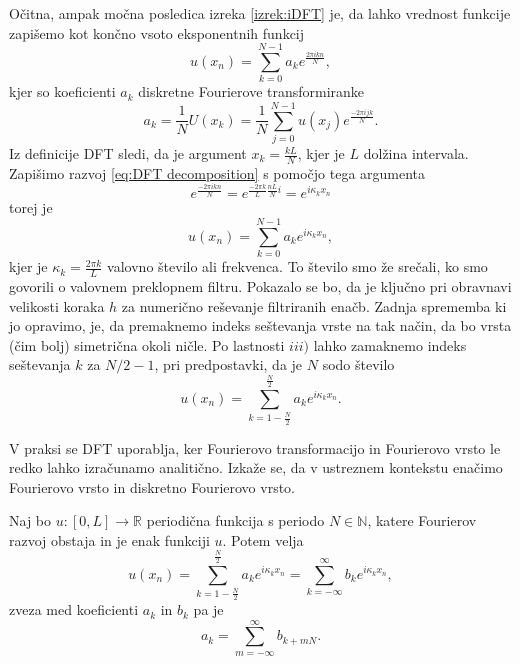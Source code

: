 \documentclass[mat2, tisk]{fmfdelo}
\newcommand{\R}{\mathbb R}
\newcommand{\N}{\mathbb N}
\begin{document}
Očitna, ampak močna posledica izreka \ref{izrek:iDFT} je, da lahko 
vrednost funkcije zapišemo kot končno vsoto eksponentnih funkcij 
\begin{equation}
  \label{eq:DFT decomposition}
u(x_n) = \sum_{k=0}^{N-1} a_k e^{\frac{2\pi i k n}{N}},
\end{equation}
kjer so koeficienti $a_k$ diskretne Fourierove transformiranke 
\begin{equation*}
a_k = \frac{1}{N} U(x_k) = \frac{1}{N} \sum_{j=0}^{N-1} u(x_j) e^{\frac{-2\pi i j k}{N}}.
\end{equation*}
Iz definicije DFT sledi, da je 
argument $x_k = \frac{k L}{N}$, kjer je $L$ dolžina intervala. Zapišimo 
razvoj \eqref{eq:DFT decomposition} s pomočjo tega argumenta 
$$
e^{\frac{-2\pi i k n}{N}} = e^{\frac{-2\pi k}{L}\frac{nL}{N}i} = e^{i\kappa_k x_n}
$$
torej je 
\begin{equation*}
u(x_n) = \sum_{k=0}^{N-1} a_k e^{i\kappa_k x_n},
\end{equation*}
kjer je $\kappa_k = \frac{2\pi k}{L}$ valovno število ali frekvenca.
To število smo že srečali, ko smo govorili o valovnem preklopnem 
filtru. Pokazalo se bo, da je ključno pri obravnavi velikosti koraka $h$ 
za numerično reševanje filtriranih enačb. Zadnja sprememba ki 
jo opravimo, je, da premaknemo indeks seštevanja vrste na tak način, da bo vrsta (čim bolj) simetrična okoli ničle. 
Po lastnosti $iii)$ lahko zamaknemo indeks seštevanja $k$ za $N/2 - 1$, pri 
predpostavki, da je $N$ sodo število
\begin{equation}
  \label{eq:DFS expantion}
u(x_n) = \sum_{k=1-\frac{N}{2}}^{\frac{N}{2}} a_k e^{i\kappa_k x_n}.
\end{equation} 

V praksi se DFT uporablja, ker Fourierovo transformacijo in 
Fourierovo vrsto le redko lahko izračunamo analitično.
Izkaže se, da v ustreznem kontekstu enačimo Fourierovo vrsto in diskretno Fourierovo vrsto.
\begin{izrek}
Naj bo $u: [0, L] \rightarrow \R$ periodična funkcija s periodo $N\in \N$, katere Fourierov 
razvoj obstaja in je enak funkciji $u$. Potem velja
\begin{equation*}
u(x_n) = \sum_{k=1-\frac{N}{2}}^{\frac{N}{2}} a_k e^{i\kappa_k x_n} =
\sum_{k=-\infty}^{\infty} b_k e^{i\kappa_k x_n},
\end{equation*}
zveza med koeficienti $a_k$ in $b_k$ pa je
\begin{equation*}
  a_k = \sum_{m=-\infty}^{\infty} b_{k + mN}. 
\end{equation*}
\end{izrek}
\end{document}
